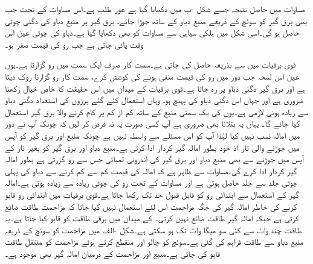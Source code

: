 مساوات  میں حاصل نتیجہ جسے شکل -ب میں دکھایا گیا  ہے غور طلب ہے۔اس مساوات کے تحت جب بھی برق گیر کو سوئچ کے ذریعے منبع دباو کے ساتھ جوڑا جائے، برق گیر پر منبع دباو کی دگنی چوٹی حاصل ہو گی۔اسی شکل میں ہلکی سیاہی سے مساوات  کو بھی دکھایا گیا ہے۔دباو کی چوٹی عین اس وقت پائی جاتی ہے جب رو کی قیمت صفر ہو۔

قوی برقیات میں  سے  بذریعہ  حاصل کی جاتی ہے۔سمت کار صرف ایک سمت میں رو گزارتا ہے۔یوں عین اس لمحہ جب دور میں رو کی قیمت منفی ہونے کی کوشش کرے، سمت کار رو گزارنا روک دیتا ہے اور برق گیر دگنی دباو پر رہ جاتا ہے۔قوی برقیات کے میدان میں اس حقیقت کا خاص خیال رکھنا ضروری ہے اور جہاں اس دگنی دباو کی پہنچ ہو، وہاں استعمال کئے گئے پرزوں کی استعداد دگنی دباو سے زیادہ ہونی لازمی ہے۔یوں  کی یک سمتی منبع کے ساتھ کم از کم  پر کام کرنے والا برق گیر استعمال کیا جائے گا۔ یہاں یہ بتلانا بھی ضروری ہے آپ کسی صورت یہ نہ فرض کر لیں کہ چونکہ آپ نے دور میں امالہ نسب نہیں کیا لہٰذا آپ کو اس مسئلے سے واسطہ نہیں ہے چونکہ منبع اور برق گیر کو آپس میں جوڑنے والی تار اذ خود بطور امالہ گیر کردار ادا کرتی ہے۔منبع دباو اور برق گیر کو بغیر تار کے آپس میں جوڑنے سے بھی منبع دباو اور برق گیر کی اندرونی لمبائی جس سے رو گزرتی ہے بطور امالہ گیر کردار ادا کرے گی۔مساوات  سے ظاہر ہے کہ امالہ کی قیمت کم سے کم کرنے سے دباو کی پہلی چوٹی جلد سے جلد حاصل ہوتی ہے اور مساوات  کے تحت  رو کی چوٹی زیادہ سے زیادہ ہوتی ہے۔امالہ گیر کے استعمال سے ابتدائی رو کو قابل قبول حد تک رکھا جاتا ہے۔قوی برقیات میں ابتدائی رو قابو کرنے کی خاطر امالہ گیر کی جگہ مزاحمت اس لئے استعمال نہیں کیا جاتا کہ مزاحمت طاقت ضائع کرتی ہے جبکہ امالہ گیر طاقت ضائع نہیں کرتی۔
 کے میدان میں برقی طاقت کو قابو کیا جاتا ہے۔یہ طاقت چند واٹ  سے کئی سو میگا واٹ  تک ہو سکتی ہے۔شکل -الف میں مزاحمت  کو سوئچ کے ذریعہ منبع دباو سے طاقت فراہم کی گئی ہے۔سوئچ کو چالو اور منقطع کرتے ہوئے مزاحمت کو منتقل طاقت قابو کی جاتی ہے۔منبع اور مزاحمت کے درمیان امالہ گیر بھی موجود ہے۔

